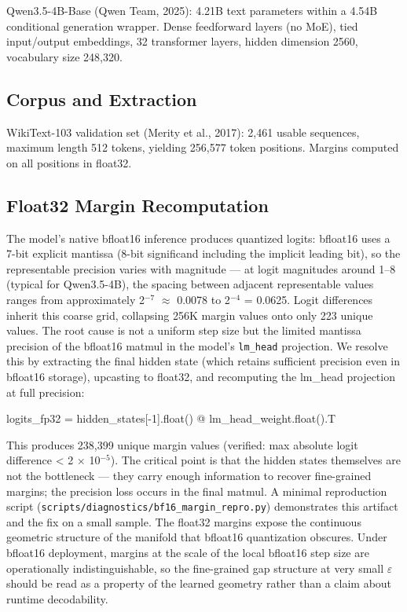 \documentclass[
  11pt,
]{article}
\begin{document}
Qwen3.5-4B-Base (Qwen Team, 2025): 4.21B text parameters within a 4.54B
conditional generation wrapper. Dense feedforward layers (no MoE), tied
input/output embeddings, 32 transformer layers, hidden dimension 2560,
vocabulary size 248,320.

\hypertarget{corpus-and-extraction}{%
\subsection{Corpus and Extraction}\label{corpus-and-extraction}}

WikiText-103 validation set (Merity et al., 2017): 2,461 usable
sequences, maximum length 512 tokens, yielding 256,577 token positions.
Margins computed on all positions in float32.

\hypertarget{float32-margin-recomputation}{%
\subsection{Float32 Margin
Recomputation}\label{float32-margin-recomputation}}

The model's native bfloat16 inference produces quantized logits:
bfloat16 uses a 7-bit explicit mantissa (8-bit significand including the
implicit leading bit), so the representable precision varies with
magnitude --- at logit magnitudes around 1--8 (typical for Qwen3.5-4B),
the spacing between adjacent representable values ranges from
approximately 2$^{-7}$ $\approx$ 0.0078 to 2$^{-4}$ = 0.0625. Logit differences inherit
this coarse grid, collapsing 256K margin values onto only 223 unique
values. The root cause is not a uniform step size but the limited
mantissa precision of the bfloat16 matmul in the model's
\texttt{lm\_head} projection. We resolve this by extracting the final
hidden state (which retains sufficient precision even in bfloat16
storage), upcasting to float32, and recomputing the lm\_head projection
at full precision:

logits\_fp32 = hidden\_states{[}-1{]}.float() @
lm\_head\_weight.float().T

This produces 238,399 unique margin values (verified: max absolute logit
difference \textless{} 2 $\times$ 10$^{-5}$). The critical point is that the hidden
states themselves are not the bottleneck --- they carry enough
information to recover fine-grained margins; the precision loss occurs
in the final matmul. A minimal reproduction script
(\texttt{scripts/diagnostics/bf16\_margin\_repro.py}) demonstrates this
artifact and the fix on a small sample. The float32 margins expose the
continuous geometric structure of the manifold that bfloat16
quantization obscures. Under bfloat16 deployment, margins at the scale
of the local bfloat16 step size are operationally indistinguishable, so
the fine-grained gap structure at very small $\varepsilon$ should be read as a
property of the learned geometry rather than a claim about runtime
decodability.
\end{document}
